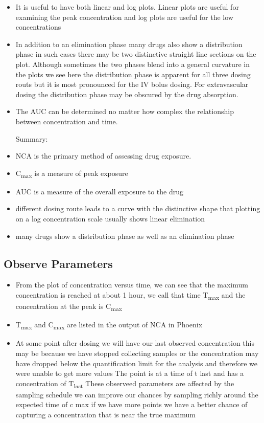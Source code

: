 \documentclass[
  letterpaper,
  DIV=11,
  numbers=noendperiod]{scrreprt}
\providecommand{\tightlist}{%
  \setlength{\itemsep}{0pt}\setlength{\parskip}{0pt}}\usepackage{longtable,booktabs,array}
\begin{document}
\begin{itemize}
\item
  It is useful to have both linear and log plots. Linear plots are
  useful for examining the peak concentration and log plots are useful
  for the low concentrations
\item
  In addition to an elimination phase many drugs also show a
  distribution phase in such cases there may be two distinctive straight
  line sections on the plot. Although sometimes the two phases blend
  into a general curvature in the plots we see here the distribution
  phase is apparent for all three dosing routs but it is most pronounced
  for the IV bolus dosing. For extravascular dosing the distribution
  phase may be obscured by the drug absorption.
\item
  The AUC can be determined no matter how complex the relationship
  between concentration and time.

  Summary:
\item
  NCA is the primary method of assessing drug exposure.
\item
  C\textsubscript{max} is a measure of peak exposure
\item
  AUC is a measure of the overall exposure to the drug
\item
  different dosing route leads to a curve with the distinctive shape
  that plotting on a log concentration scale usually shows linear
  elimination
\item
  many drugs show a distribution phase as well as an elimination phase\\
\end{itemize}

\hypertarget{observe-parameters}{%
\subsection{Observe Parameters}\label{observe-parameters}}

\begin{itemize}
\tightlist
\item
  From the plot of concentration versus time, we can see that the
  maximum concentration is reached at about 1 hour, we call that time
  T\textsubscript{max} and the concentration at the peak is
  C\textsubscript{max}
\item
  T\textsubscript{max} and C\textsubscript{max} are listed in the output
  of NCA in Phoenix
\item
  At some point after dosing we will have our last observed
  concentration this may be because we have stopped collecting samples
  or the concentration may have dropped below the quantification limit
  for the analysis and therefore we were unable to get more values The
  point is at a time of t last and has a concentration of
  T\textsubscript{last} These observeed parameters are affected by the
  sampling schedule we can improve our chances by sampling richly around
  the expected time of c max if we have more points we have a better
  chance of capturing a concentration that is near the true maximum
\end{itemize}
\end{document}
